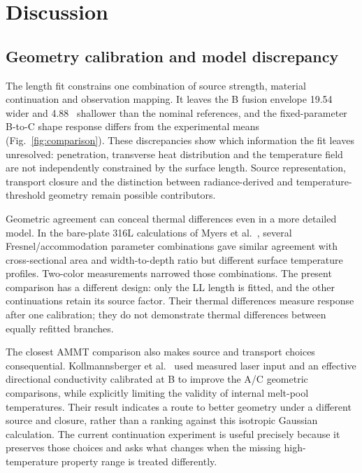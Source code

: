 \section{Discussion}
\label{sec:discussion}

\subsection{Geometry calibration and model discrepancy}
The length fit constrains one combination of source strength, material continuation and observation mapping. It leaves the B fusion envelope 19.54~\um{} wider and 4.88~\um{} shallower than the nominal references, and the fixed-parameter B-to-C shape response differs from the experimental means (Fig.~\ref{fig:comparison}). These discrepancies show which information the fit leaves unresolved: penetration, transverse heat distribution and the temperature field are not independently constrained by the surface length. Source representation, transport closure and the distinction between radiance-derived and temperature-threshold geometry remain possible contributors.

Geometric agreement can conceal thermal differences even in a more detailed model. In the bare-plate 316L calculations of Myers et al.~\cite{myers2023}, several Fresnel/accommodation parameter combinations gave similar agreement with cross-sectional area and width-to-depth ratio but different surface temperature profiles. Two-color measurements narrowed those combinations. The present comparison has a different design: only the LL length is fitted, and the other continuations retain its source factor. Their thermal differences measure response after one calibration; they do not demonstrate thermal differences between equally refitted branches.

The closest AMMT comparison also makes source and transport choices consequential. Kollmannsberger et al.~\cite{kollmannsberger2019} used measured laser input and an effective directional conductivity calibrated at B to improve the A/C geometric comparisons, while explicitly limiting the validity of internal melt-pool temperatures. Their result indicates a route to better geometry under a different source and closure, rather than a ranking against this isotropic Gaussian calculation. The current continuation experiment is useful precisely because it preserves those choices and asks what changes when the missing high-temperature property range is treated differently.

